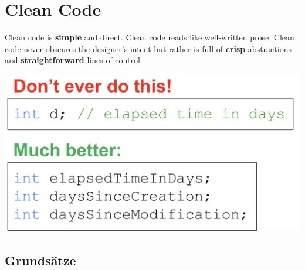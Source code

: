 \documentclass[10pt]{article}
\begin{document}
\section{Clean Code}
Clean code is \textbf{simple} and direct. Clean code reads like well-written prose. Clean code never obscures the designer’s intent but rather is full of \textbf{crisp} abstractions and \textbf{straightforward} lines of control.
\begin{center}
\includegraphics[scale=1.0]{assets/clean_code.tif}
\end{center}

\subsection{Grundsätze}


\end{document}
